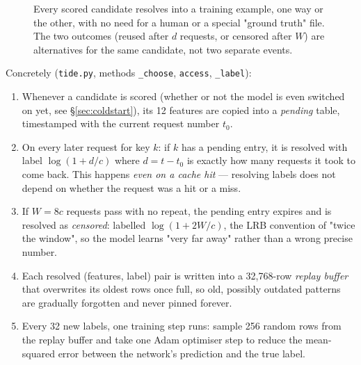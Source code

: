 \documentclass[10pt,a4paper]{article}
\newcommand{\code}[1]{\texttt{#1}}
\begin{document}
\begin{figure}[H]
\centering
{}
\caption{Every scored candidate resolves into a training example, one way or the other, with no need for
a human or a special "ground truth" file. The two outcomes (reused after $d$ requests, or censored after
$W$) are alternatives for the same candidate, not two separate events.}
\end{figure}

Concretely (\code{tide.py}, methods \code{\_choose}, \code{access}, \code{\_label}):
\begin{enumerate}
  \item Whenever a candidate is scored (whether or not the model is even switched on yet, see
        \S\ref{sec:coldstart}), its 12 features are copied into a \emph{pending} table, timestamped with
        the current request number $t_0$.
  \item On every later request for key $k$: if $k$ has a pending entry, it is resolved with label
        $\log(1+d/c)$ where $d = t - t_0$ is exactly how many requests it took to come back. This happens
        \emph{even on a cache hit} — resolving labels does not depend on whether the request was a hit or
        a miss.
  \item If $W = 8c$ requests pass with no repeat, the pending entry expires and is resolved as
        \emph{censored}: labelled $\log(1+2W/c)$, the LRB convention of "twice the window", so the model
        learns "very far away" rather than a wrong precise number.
  \item Each resolved (features, label) pair is written into a 32{,}768-row \emph{replay buffer} that
        overwrites its oldest rows once full, so old, possibly outdated patterns are gradually forgotten
        and never pinned forever.
  \item Every 32 new labels, one training step runs: sample 256 random rows from the replay buffer and
        take one Adam optimiser step to reduce the mean-squared error between the network's prediction and
        the true label.
\end{enumerate}
\end{document}

